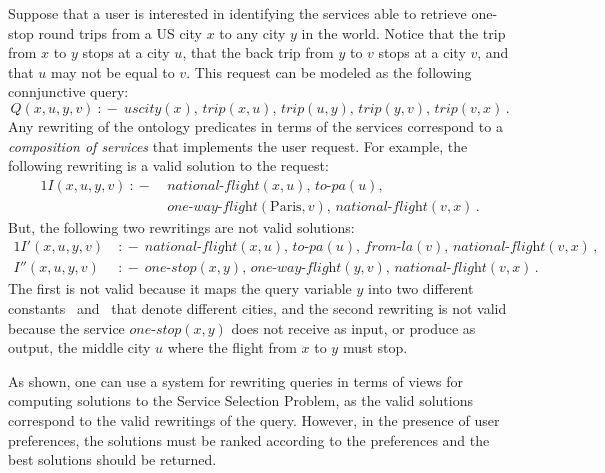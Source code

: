 \documentclass{llncs}
\newcommand{\qrule}{:\!\!-}
\newcommand{\trip}{\textit{trip}}
\newcommand{\UScity}{\textit{uscity}}
\newcommand{\PA}{\text{Paris}}
\newcommand{\LA}{\text{LA}}
\newcommand{\nationalFlight}{\textit{national-flight}}
\newcommand{\onewayFlight}{\textit{one-way-flight}}
\newcommand{\onestop}{\textit{one-stop}}
\newcommand{\toPA}{\textit{to-pa}}
\newcommand{\fromLA}{\textit{from-la}}
\begin{document}
Suppose that a user is interested in identifying the services able to retrieve
one-stop round trips from a US city $x$ to any city $y$ in the world. Notice
that the trip from $x$ to $y$ stops at a city $u$, that the back trip from $y$
to $v$ stops at a city $v$, and that $u$ may not be equal to $v$.
This request can be modeled as the following connjunctive query:
\[ Q(x,u,y,v)\ \qrule\ \UScity(x),\,\trip(x,u),\,\trip(u,y),\,\trip(y,v),\,\trip(v,x)\,. \]
Any rewriting of the ontology predicates in terms of the services correspond
to a \emph{composition of services} that implements the user request.
For example, the following rewriting is a valid solution to the request:
\begin{alignat*}{1}
I(x,u,y,v)\ \qrule\ &\nationalFlight(x,u),\,\toPA(u),\, \\
                    &\onewayFlight(\PA,v),\,\nationalFlight(v,x)\,. 
\end{alignat*}
But, the following two rewritings are not valid solutions:
\begin{alignat*}{1}
 I'(x,u,y,v)\  &\qrule\ \nationalFlight(x,u),\,\toPA(u),\,\fromLA(v),\,\nationalFlight(v,x)\,, \\
I''(x,u,y,v)\  &\qrule\ \onestop(x,y),\,\onewayFlight(y,v),\,\nationalFlight(v,x)\,.
\end{alignat*}
The first is not valid because it maps the query variable $y$ into two different
constants \PA\ and \LA\ that denote different cities, and the second rewriting is
not valid because the service $\onestop(x,y)$ does not receive as input, or produce
as output, the middle city $u$ where the flight from $x$ to $y$ must stop.

As shown, one can use a system for rewriting queries in terms of views
for computing solutions to the Service Selection Problem, as the valid
solutions correspond to the valid rewritings of the query. However, in
the presence of user preferences, the solutions must be ranked according
to the preferences and the best solutions should be returned.
\end{document}
